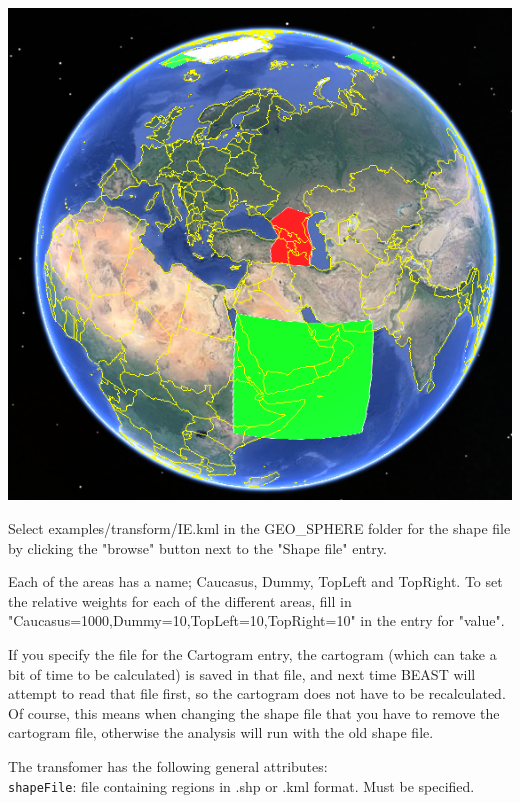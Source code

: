 \documentclass{article}
\def\beast-geo{GEO\_SPHERE}
\begin{document}
\begin{center}
\includegraphics[scale=0.4]{figures/IEmap.png}
\end{center}

Select examples/transform/IE.kml in the \beast-geo{} folder for the shape file by clicking the "browse" button next to the "Shape file" entry.

Each of the areas has a name; Caucasus, Dummy, TopLeft and TopRight. To set the relative weights for each of the different areas, fill in\\ "Caucasus=1000,Dummy=10,TopLeft=10,TopRight=10" in the entry for "value". 

If you specify the file for the Cartogram entry, the cartogram (which can take a bit of time to be calculated) is saved in that file, and next time BEAST will attempt to read that file first, so the cartogram does not have to be recalculated. Of course, this means when changing the shape file that you have to remove the cartogram file, otherwise the analysis will run with the old shape file.

The transfomer has the following general attributes:\\

{\tt shapeFile}: file containing regions in .shp or .kml format. Must be specified.\\
\end{document}
